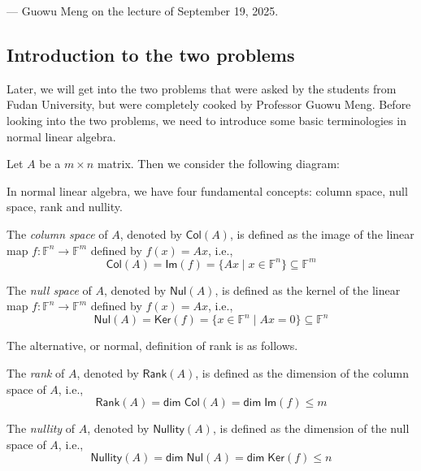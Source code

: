 \documentclass[
	11pt, %
	fleqn, %
	a4paper, %
]{LegrandOrangeBook}
\renewcommand{\ker}[1]{\mathsf{Ker}(#1)} %
\renewcommand{\Im}[1]{\mathsf{Im}(#1)} %
\newcommand{\F}{\mathbb{F}} %
\newcommand{\rank}[1]{\mathsf{Rank}(#1)} %
\newcommand{\nullity}[1]{\mathsf{Nullity}(#1)} %
\newcommand{\nul}[1]{\mathsf{Nul}(#1)} %
\newcommand{\col}[1]{\mathsf{Col}(#1)} %
\renewcommand{\dim}{\mathsf{dim\;}} %
\begin{document}
\begin{flushright}
    --- Guowu Meng on the lecture of September 19, 2025.
\end{flushright}

\subsection{Introduction to the two problems}

Later, we will get into the two problems that were asked by the students from Fudan University, but were completely cooked by Professor Guowu Meng. Before looking into the two problems, we need to introduce some basic terminologies in normal linear algebra.

Let $A$ be a $m \times n$ matrix. Then we consider the following diagram:
\begin{center}
\end{center}

In normal linear algebra, we have four fundamental concepts: column space, null space, rank and nullity.
\begin{definition}
    The \emph{column space} of $A$, denoted by $\col{A}$, is defined as the image of the linear map $f : \F^n \to \F^m$ defined by $f(x) = Ax$, i.e.,
    \[
        \col{A} = \Im{f} = \{ Ax \mid x \in \F^n \} \subseteq \F^m
    \]
\end{definition}

\newpage

\begin{definition}
    The \emph{null space} of $A$, denoted by $\nul{A}$, is defined as the kernel of the linear map $f : \F^n \to \F^m$ defined by $f(x) = Ax$, i.e.,
    \[
        \nul{A} = \ker{f} = \{ x \in \F^n \mid Ax = 0 \} \subseteq \F^n
    \]
\end{definition}

The alternative, or normal, definition of rank is as follows.
\begin{definition}[Rank]
    The \emph{rank} of $A$, denoted by $\rank{A}$, is defined as the dimension of the column space of $A$, i.e.,
    \[
        \rank{A} = \dim{\col{A}} = \dim{\Im{f}} \leq m
    \]
\end{definition}

\begin{definition}[Nullity]
    The \emph{nullity} of $A$, denoted by $\nullity{A}$, is defined as the dimension of the null space of $A$, i.e.,
    \[
        \nullity{A} = \dim{\nul{A}} = \dim{\ker{f}} \leq n
    \]
\end{definition}
\end{document}
